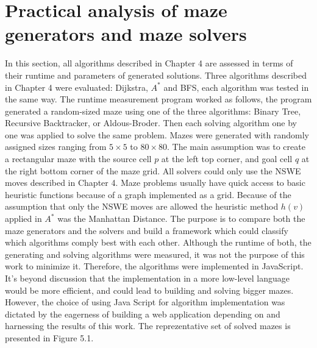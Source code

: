 \section{Practical analysis of maze generators and maze solvers}
In this section, all algorithms described in Chapter 4 are assessed in terms of their runtime and parameters of generated solutions. Three algorithms described
in Chapter 4 were evaluated: Dijkstra, $A^*$ and BFS, each algorithm was tested in the same way. The runtime measurement program worked as follows,
the program generated a random-sized maze using one of the three algorithms: Binary Tree, Recursive Backtracker, or Aldous-Broder. Then each solving
algorithm one by one was applied to solve the same problem. Mazes were generated with randomly assigned sizes ranging from $5 \times 5$ to $80 \times 80$.
The main assumption was to create a rectangular maze with the source cell $p$ at the left top corner, and goal cell $q$ at the right bottom corner of the maze grid. 
All solvers could only use the NSWE moves described in Chapter 4. Maze problems usually have quick access to basic heuristic functions because of
a graph implemented as a grid. Because of the assumption that only the NSWE moves are allowed the heuristic method $h(v)$ applied in $A^*$ was the
Manhattan Distance.
The purpose is to compare both the maze generators and the solvers and build a framework which could classify which algorithms comply best with each other.
Although the runtime of both, the generating and solving algorithms were measured, it was not the purpose of this work to minimize it. Therefore, the algorithms
were implemented in JavaScript. It's beyond discussion that the implementation in a more low-level language would be more efficient, and could lead to building
and solving bigger mazes. However, the choice of using Java Script for algorithm implementation was dictated by the eagerness of building a web application
depending on and harnessing the results of this work. 
The reprezentative set of solved mazes is presented in Figure 5.1.%
